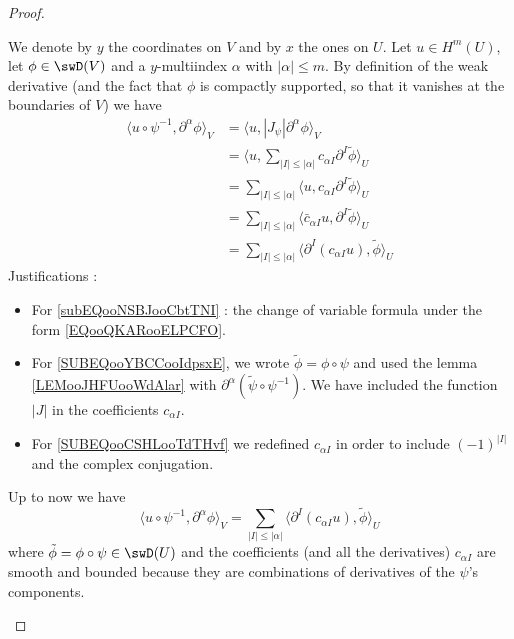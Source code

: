 \begin{proof}
\begin{subproof}
        We denote by \( y\) the coordinates on \( V\) and by \( x\) the ones on \( U\). Let \( u\in H^m(U)\), let \( \phi\in\swD(V)\) and a \( y\)-multiindex \( \alpha\) with \( | \alpha |\leq m\). By definition of the weak derivative (and the fact that \( \phi\) is compactly supported, so that it vanishes at the boundaries of \( V\)) we have
        \begin{subequations}
            \begin{align}
                \langle u\circ\psi^{-1}, \partial^{\alpha}\phi\rangle_V &=\langle u, | J_{\psi}| \partial^{\alpha}\phi \rangle_V   \label{subEQooNSBJooCbtTNI}    \\
                &=\langle u, \sum_{| I |\leq | \alpha |}c_{\alpha I}\partial^I\tilde \phi\rangle_U  \label{SUBEQooYBCCooIdpsxE}   \\
                    &=\sum_{ |I|\leq |\alpha|}\langle u, c_{\alpha I}\partial^{ I}\tilde\phi\rangle_U \\
                    &=\sum_{ |I|\leq |\alpha|}\langle \bar c_{\alpha I}u, \partial^{ I}\tilde \phi\rangle_U\\
                    &=\sum_{ |I|\leq |\alpha|}\langle \partial^{ I}(c_{\alpha I}u), \tilde \phi\rangle_U       \label{SUBEQooCSHLooTdTHvf}
            \end{align}
        \end{subequations}
        Justifications :
        \begin{itemize}
            \item 
                For \eqref{subEQooNSBJooCbtTNI} : the change of variable formula under the form \eqref{EQooQKARooELPCFO}.
            \item
                For \eqref{SUBEQooYBCCooIdpsxE}, we wrote \( \tilde \phi=\phi\circ\psi\) and used the lemma \ref{LEMooJHFUooWdAlar} with \( \partial^{\alpha}(\tilde \psi\circ\psi^{-1})\). We have included the function \( | J |\) in the coefficients \( c_{\alpha I}\).

    \item
        For \eqref{SUBEQooCSHLooTdTHvf} we redefined \( c_{\alpha I}\) in order to include \( (-1)^{|  I |}\) and the complex conjugation.

        \end{itemize}

        Up to now we have 
        \begin{equation}
          \langle u\circ\psi^{-1}, \partial^{\alpha}\phi\rangle_V =  \sum_{| I |\leq | \alpha |}\langle \partial^{I}(c_{\alpha I}u), \tilde \phi\rangle_U
        \end{equation}
        where \( \tilde \phi=\phi\circ\psi\in \swD(U)\) and the coefficients (and all the derivatives) \( c_{\alpha I}\) are smooth and bounded because they are combinations of derivatives of the \( \psi\)'s components.


\end{subproof}
\end{proof}
